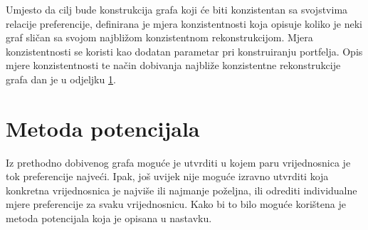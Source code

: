 \documentclass[lmodern, utf8, diplomski, numeric]{fer}
\newcommand{\graph}[1]{\mathcal{#1}}
\begin{document}
  Umjesto da cilj bude konstrukcija grafa koji će biti konzistentan sa svojstvima relacije preferencije, definirana je mjera konzistentnosti koja opisuje koliko je neki graf sličan sa svojom najbližom konzistentnom rekonstrukcijom.
  Mjera konzistentnosti se koristi kao dodatan parametar pri konstruiranju portfelja.
  Opis mjere konzistentnosti te način dobivanja najbliže konzistentne rekonstrukcije grafa dan je u odjeljku \ref{sec:metpot}.
  
  
  

  \section{Metoda potencijala}
  \label{sec:metpot}
  Iz prethodno dobivenog grafa moguće je utvrditi u kojem paru vrijednosnica je tok preferencije najveći.
  Ipak, još uvijek nije moguće izravno utvrditi koja konkretna vrijednosnica je najviše ili najmanje poželjna, ili odrediti individualne mjere preferencije za svaku vrijednosnicu.
  Kako bi to bilo moguće korištena je metoda potencijala koja je opisana u nastavku.
  
  
\end{document}
